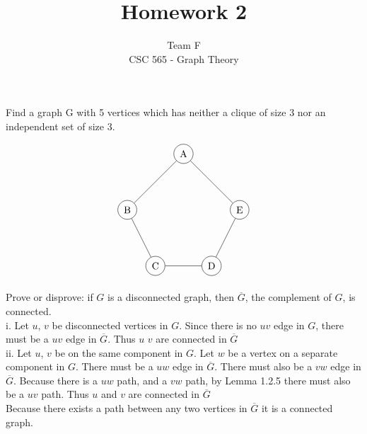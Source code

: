 \documentclass[12pt]{article}
\newenvironment{question}[2][Question]{\begin{trivlist}
\item[\hskip \labelsep {\bfseries #1}\hskip \labelsep {\bfseries #2.}]}{\end{trivlist}}
\begin{document}
 
 
 
\title{Homework 2}%
\author{Team F\\ %
CSC 565 - Graph Theory} %
 
\maketitle
 
\begin{question}{1}
Find a graph G with 5 vertices which has neither a clique of size 3 nor an independent set of size 3.
\end{question}

\begin{align*}
\begin{tikzpicture}
    \node[shape=circle,draw=black] (C) at (1,0) {C};
    \node[shape=circle,draw=black] (B) at (0,2) {B};
    \node[shape=circle,draw=black] (A) at (2,4) {A};
    \node[shape=circle,draw=black] (D) at (3,0) {D};
    \node[shape=circle,draw=black] (E) at (4,2) {E};
    \path [] (A) edge node[left] {} (B);
    \path [] (B) edge node[left] {} (C);
    \path [] (C) edge node[left] {} (D);
    \path [] (D) edge node[left] {} (E);
    \path [] (E) edge node[left] {} (A);
\end{tikzpicture}
\end{align*}


\begin{question}{5}
    Prove or disprove: if $G$ is a disconnected graph, then $\overline{G}$, the complement of $G$, is connected.\\  
    
    i. Let $u$, $v$ be disconnected vertices in $G$. Since there is no $uv$ edge in $G$, there must be a $uv$ edge in $\overline{G}$. Thus $u$ $v$ are connected in $\overline{G}$\\
        
    ii. Let $u$, $v$ be on the same component in $G$. Let $w$ be a vertex on a separate component in $G$. There must be a $uw$ edge in $\overline{G}$. There must also be a $vw$ edge in $\overline{G}$. 
    Because there is a $uw$ path, and a $vw$ path, by Lemma 1.2.5 there must also be a $uv$ path. Thus $u$ and $v$ are connected in $\overline{G}$\\
    
    Because there exists a path between any two vertices in $\overline{G}$ it is a connected graph.
\end{question}
\end{document}
